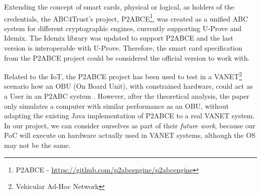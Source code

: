 Extending the concept of smart cards, physical or logical, as holders of the credentials, the ABC4Trust's project, P2ABCE\footnote{\acl{P2ABCE} - \url{https://github.com/p2abcengine/p2abcengine}}, was created as a unified ABC system for different cryptographic engines, currently supporting U-Prove and Idemix. The Idemix library was updated to support P2ABCE and the last version is interoperable with U-Prove. Therefore, the smart card specification from the P2ABCE project could be considered the official version to work with.


Related to the IoT, the P2ABCE project has been used to test in a VANET\footnote{Vehicular Ad-Hoc Network} scenario how an OBU (On Board Unit), with constrained hardware, could act as a User in an P2ABC system \citep{vanet}. However, after the theoretical analysis, the paper only simulates a computer with similar performance as an OBU, without adapting the existing Java implementation of P2ABCE to a real VANET system. In our project, we can consider ourselves as part of their \textit{future work}, because our PoC will execute on hardware actually used in VANET systems, although the OS may not be the same.


